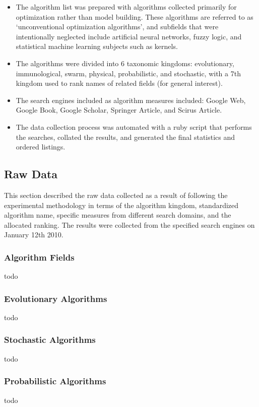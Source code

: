 \documentclass[a4paper, 11pt]{article}
\begin{document}
\begin{itemize}
	\item The algorithm list was prepared with algorithms collected primarily for optimization rather than model building. These algorithms are referred to as `unconventional optimization algorithms', and subfields that were intentionally neglected include artificial neural networks, fuzzy logic, and statistical machine learning subjects such as kernels.
	\item The algorithms were divided into 6 taxonomic kingdoms: evolutionary, immunological, swarm, physical, probabilistic, and stochastic, with a 7th kingdom used to rank names of related fields (for general interest).
	\item The search engines included as algorithm measures included: Google Web, Google Book, Google Scholar, Springer Article, and Scirus Article.
	\item The data collection process was automated with a ruby script that performs the searches, collated the results, and generated the final statistics and ordered listings.
\end{itemize}

% 
% 
\subsection{Raw Data}
This section described the raw data collected as a result of following the experimental methodology in terms of the algorithm kingdom, standardized algorithm name, specific measures from different search domains, and the allocated ranking. The results were collected from the specified search engines on January 12th 2010.

\subsubsection{Algorithm Fields}
todo

\subsubsection{Evolutionary Algorithms}
todo

\subsubsection{Stochastic Algorithms}
todo

\subsubsection{Probabilistic Algorithms}
todo
\end{document}
